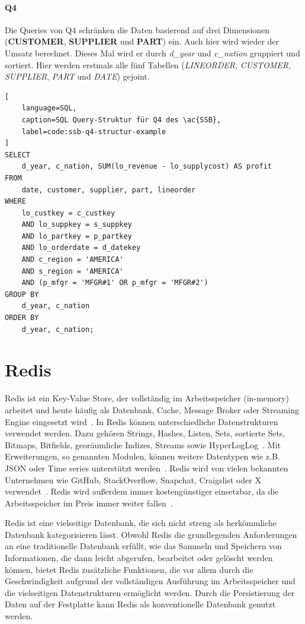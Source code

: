 \paragraph{Q4}
Die Queries von Q4 schränken die Daten basierend auf drei Dimensionen (\textbf{CUSTOMER}, \textbf{SUPPLIER} und \textbf{PART}) ein.
Auch hier wird wieder der Umsatz berechnet.
Dieses Mal wird er durch \emph{d\_year} und \emph{c\_nation} gruppiert und sortiert.
Hier werden erstmals alle fünf Tabellen (\emph{LINEORDER}, \emph{CUSTOMER}, \emph{SUPPLIER}, \emph{PART} und \emph{DATE}) gejoint.
\begin{lstlisting}[
    language=SQL,
    caption=SQL Query-Struktur für Q4 des \ac{SSB},
    label=code:ssb-q4-structur-example
]
SELECT 
    d_year, c_nation, SUM(lo_revenue - lo_supplycost) AS profit
FROM 
    date, customer, supplier, part, lineorder
WHERE 
    lo_custkey = c_custkey
    AND lo_suppkey = s_suppkey
    AND lo_partkey = p_partkey
    AND lo_orderdate = d_datekey
    AND c_region = 'AMERICA'
    AND s_region = 'AMERICA'
    AND (p_mfgr = 'MFGR#1' OR p_mfgr = 'MFGR#2')
GROUP BY 
    d_year, c_nation
ORDER BY 
    d_year, c_nation;

\end{lstlisting}
\section{Redis}

Redis ist ein Key-Value Store, der vollständig im Arbeitsspeicher (in-memory) arbeitet und heute häufig als Datenbank, Cache, Message Broker oder Streaming Engine eingesetzt wird~\cite{redis_introduction_nodate}.
In Redis können unterschiedliche Datenstrukturen verwendet werden. Dazu gehören Strings, Hashes, Listen, Sets, sortierte Sets, Bitmaps, Bitfields, georäumliche Indizes, Streams sowie HyperLogLog~\cite{redis_data_nodate}.
Mit Erweiterungen, so genannten Modulen, können weitere Datentypen wie z.B. JSON oder Time series unterstützt werden~\cite{redis_}.
Redis wird von vielen bekannten Unternehmen wie GitHub, StackOverflow, Snapchat, Craigslist oder X verwendet~\cite{redis_whos_nodate}.
Redis wird außerdem immer kostengünstiger einsetzbar, da die Arbeitsspeicher im Preis immer weiter fallen~\cite{bergai_trends_2020}.


Redis ist eine vielseitige Datenbank, die sich nicht streng als herkömmliche Datenbank kategorisieren lässt. Obwohl Redis die grundlegenden Anforderungen an eine traditionelle Datenbank erfüllt, wie das Sammeln und Speichern von Informationen, die dann leicht abgerufen, bearbeitet oder gelöscht werden können, bietet Redis zusätzliche Funktionen, die vor allem durch die Geschwindigkeit aufgrund der vollständigen Ausführung im Arbeitsspeicher und die vielseitigen Datenstrukturen ermöglicht werden.
Durch die Persistierung der Daten auf der Festplatte kann Redis als konventionelle Datenbank genutzt werden.

